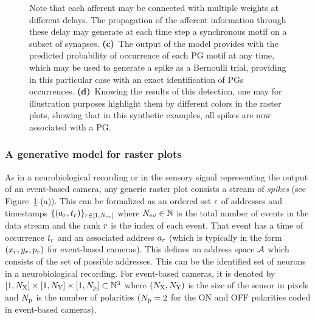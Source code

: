 \documentclass[default]{sn-jnl}%
\theoremstyle{thmstyleone}%
\theoremstyle{thmstyletwo}%
\theoremstyle{thmstylethree}%
\begin{document}
\begin{figure}[t!]
{	    Note that each afferent may be connected with multiple weights at different delays. The propagation of the afferent information through these delay may generate at each time step a synchronous motif on a subset of synapses. %
	    {\bf (c)}~The output of the model provides with the predicted probability of occurrence of each PG motif at any time, which may be used to generate a spike as a Bernoulli trial, providing in this particular case with an exact identification of PGs occurrences.
	    {\bf (d)}~Knowing the results of this detection, one may for illustration purposes highlight them by different colors in the raster plots, showing that in this synthetic examples, all spikes are now associated with a PG. 
	     }
    \label{fig:model}
\end{figure}
% 
\subsubsection{A generative model for raster plots}
%
As in a neurobiological recording or in the sensory signal representing the output of an event-based camera,  any generic raster plot consists a stream of \emph{spikes} (see Figure~\ref{fig:model}-(a)). This can be formalized as an ordered set $\epsilon$ of addresses and timestamps $\{(a_r, t_r)\}_{r \in [1,N_{ev}]}$ where $N_{ev} \in \mathbb{N} $ is the total number of events in the data stream and the rank $r$ is the index of each event. That event has a time of occurrence $t_r$  and an associated address $a_r$ (which is typically in the form $(x_r, y_r, p_r)$ for event-based cameras). This defines an address space $\mathcal{A}$ which consists of the set of possible addresses. This can be the identified set of neurons in a neurobiological recording. For event-based cameras, it is denoted by $[1, N_\text{X}]\times[1, N_\text{Y}] \times [1, N_\text{p}] \subset \mathbb{N}^3$ where $(N_\text{X}, N_\text{Y})$ is the size of the sensor in pixels and $N_\text{p}$ is the number of polarities ($N_\text{p}=2$ for the ON and OFF polarities coded in event-based cameras). 
\end{document}
